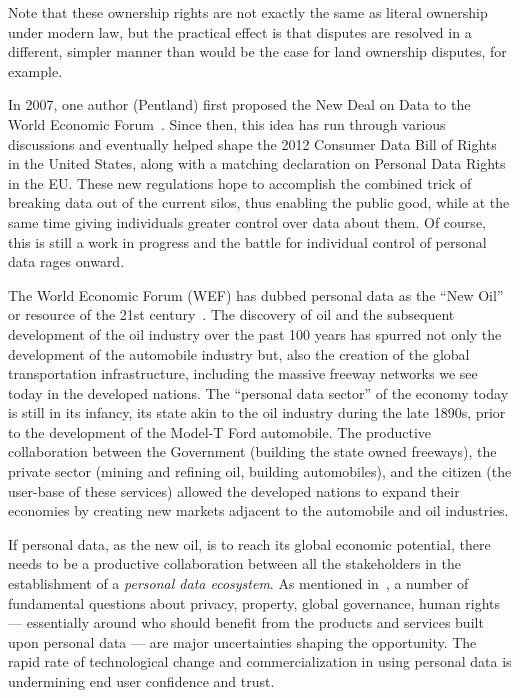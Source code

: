 Note that these ownership rights are not exactly the same as literal ownership under modern law, but the practical effect is that disputes are resolved in a different, simpler manner than would be the case for land ownership disputes, for example.

In 2007, one author (Pentland) first proposed the New Deal on Data to the World Economic Forum~\cite{WEF2011}. 
Since then, this idea has run through various discussions and eventually helped shape the 2012 Consumer Data Bill of Rights in the United States, along with a matching declaration on Personal Data Rights in the EU.
These new regulations hope to accomplish the combined trick of breaking data out of the current silos, thus enabling the public good, while at the same time giving individuals greater control over data about them.
Of course, this is still a work in progress and the battle for individual control of personal data rages onward.


The World Economic Forum (WEF) has dubbed personal data as the ``New Oil'' or resource of the 21st century~\cite{WEF2011}.
The discovery of oil and the subsequent development of the oil industry over the past 100 years has spurred not only the development of the automobile industry but, also the creation of the global transportation infrastructure, including the massive freeway networks we see today in the developed nations.
The ``personal data sector'' of the economy today is still in its infancy, its state akin to the oil industry during the late 1890s, prior to the development of the Model-T Ford automobile.
The productive collaboration between the Government (building the state owned freeways), the private sector (mining and refining oil, building automobiles), and the citizen (the user-base of these services) allowed the developed nations to expand their economies by creating new markets adjacent to the automobile and oil industries.

If personal data, as the new oil, is to reach  its global economic potential, there needs to be a productive collaboration between all the stakeholders in the establishment of a {\em personal data ecosystem}.
As mentioned in~\cite{WEF2011}, a number of fundamental questions about privacy, property, 
global governance, human rights --- essentially around who should benefit from the products and services built upon personal data --- are major uncertainties shaping the opportunity.
The rapid rate of technological change and commercialization in using personal data is undermining end user confidence and trust.

